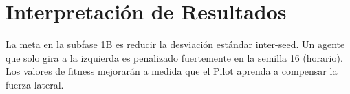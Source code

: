 \documentclass{article}
\begin{document}
\section{Interpretación de Resultados}
La meta en la subfase 1B es reducir la desviación estándar inter-seed. Un agente que solo gira a la izquierda es penalizado fuertemente en la semilla 16 (horario). Los valores de fitness mejorarán a medida que el Pilot aprenda a compensar la fuerza lateral.
\end{document}
